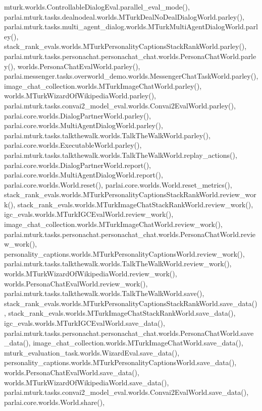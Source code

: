 mturk.\+worlds.\+Controllable\+Dialog\+Eval.\+parallel\+\_\+eval\+\_\+mode(), parlai.\+mturk.\+tasks.\+dealnodeal.\+worlds.\+M\+Turk\+Deal\+No\+Deal\+Dialog\+World.\+parley(), parlai.\+mturk.\+tasks.\+multi\+\_\+agent\+\_\+dialog.\+worlds.\+M\+Turk\+Multi\+Agent\+Dialog\+World.\+parley(), stack\+\_\+rank\+\_\+evals.\+worlds.\+M\+Turk\+Personality\+Captions\+Stack\+Rank\+World.\+parley(), parlai.\+mturk.\+tasks.\+personachat.\+personachat\+\_\+chat.\+worlds.\+Persona\+Chat\+World.\+parley(), worlds.\+Persona\+Chat\+Eval\+World.\+parley(), parlai.\+messenger.\+tasks.\+overworld\+\_\+demo.\+worlds.\+Messenger\+Chat\+Task\+World.\+parley(), image\+\_\+chat\+\_\+collection.\+worlds.\+M\+Turk\+Image\+Chat\+World.\+parley(), worlds.\+M\+Turk\+Wizard\+Of\+Wikipedia\+World.\+parley(), parlai.\+mturk.\+tasks.\+convai2\+\_\+model\+\_\+eval.\+worlds.\+Convai2\+Eval\+World.\+parley(), parlai.\+core.\+worlds.\+Dialog\+Partner\+World.\+parley(), parlai.\+core.\+worlds.\+Multi\+Agent\+Dialog\+World.\+parley(), parlai.\+mturk.\+tasks.\+talkthewalk.\+worlds.\+Talk\+The\+Walk\+World.\+parley(), parlai.\+core.\+worlds.\+Executable\+World.\+parley(), parlai.\+mturk.\+tasks.\+talkthewalk.\+worlds.\+Talk\+The\+Walk\+World.\+replay\+\_\+actions(), parlai.\+core.\+worlds.\+Dialog\+Partner\+World.\+report(), parlai.\+core.\+worlds.\+Multi\+Agent\+Dialog\+World.\+report(), parlai.\+core.\+worlds.\+World.\+reset(), parlai.\+core.\+worlds.\+World.\+reset\+\_\+metrics(), stack\+\_\+rank\+\_\+evals.\+worlds.\+M\+Turk\+Personality\+Captions\+Stack\+Rank\+World.\+review\+\_\+work(), stack\+\_\+rank\+\_\+evals.\+worlds.\+M\+Turk\+Image\+Chat\+Stack\+Rank\+World.\+review\+\_\+work(), igc\+\_\+evals.\+worlds.\+M\+Turk\+I\+G\+C\+Eval\+World.\+review\+\_\+work(), image\+\_\+chat\+\_\+collection.\+worlds.\+M\+Turk\+Image\+Chat\+World.\+review\+\_\+work(), parlai.\+mturk.\+tasks.\+personachat.\+personachat\+\_\+chat.\+worlds.\+Persona\+Chat\+World.\+review\+\_\+work(), personality\+\_\+captions.\+worlds.\+M\+Turk\+Personality\+Captions\+World.\+review\+\_\+work(), parlai.\+mturk.\+tasks.\+talkthewalk.\+worlds.\+Talk\+The\+Walk\+World.\+review\+\_\+work(), worlds.\+M\+Turk\+Wizard\+Of\+Wikipedia\+World.\+review\+\_\+work(), worlds.\+Persona\+Chat\+Eval\+World.\+review\+\_\+work(), parlai.\+mturk.\+tasks.\+talkthewalk.\+worlds.\+Talk\+The\+Walk\+World.\+save(), stack\+\_\+rank\+\_\+evals.\+worlds.\+M\+Turk\+Personality\+Captions\+Stack\+Rank\+World.\+save\+\_\+data(), stack\+\_\+rank\+\_\+evals.\+worlds.\+M\+Turk\+Image\+Chat\+Stack\+Rank\+World.\+save\+\_\+data(), igc\+\_\+evals.\+worlds.\+M\+Turk\+I\+G\+C\+Eval\+World.\+save\+\_\+data(), parlai.\+mturk.\+tasks.\+personachat.\+personachat\+\_\+chat.\+worlds.\+Persona\+Chat\+World.\+save\+\_\+data(), image\+\_\+chat\+\_\+collection.\+worlds.\+M\+Turk\+Image\+Chat\+World.\+save\+\_\+data(), mturk\+\_\+evaluation\+\_\+task.\+worlds.\+Wizard\+Eval.\+save\+\_\+data(), personality\+\_\+captions.\+worlds.\+M\+Turk\+Personality\+Captions\+World.\+save\+\_\+data(), worlds.\+Persona\+Chat\+Eval\+World.\+save\+\_\+data(), worlds.\+M\+Turk\+Wizard\+Of\+Wikipedia\+World.\+save\+\_\+data(), parlai.\+mturk.\+tasks.\+convai2\+\_\+model\+\_\+eval.\+worlds.\+Convai2\+Eval\+World.\+save\+\_\+data(), parlai.\+core.\+worlds.\+World.\+share(), 